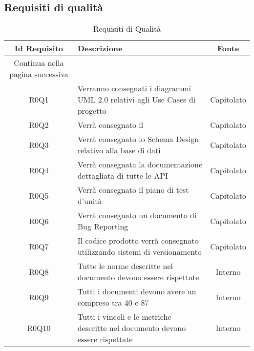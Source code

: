 \begin{center}
\begin{longtable}{cm{8cm}c }
\end{longtable}

\end{center}

\subsection{Requisiti di qualità}

\begin{center}
	\renewcommand{\arraystretch}{2.2}
	
	\begin{longtable}{ c m{8cm} c }
		
		\rowcolor[HTML]{232f3e}
	
		\rowcolors{3}{tableRow}{}
		\color[HTML]{FFFFFF} \textbf{Id Requisito} & \color[HTML]{FFFFFF} \centering\textbf{Descrizione} & \color[HTML]{FFFFFF} \textbf{Fonte} \\
	\endhead
\rowcolor{white}\multicolumn{3}{c}
   { Continua nella pagina successiva} \\
   \endfoot
   \caption [Requisiti di Qualità]{Requisiti di Qualità}
	\label{tabella:reqP1}
   \endlastfoot
		R0Q1 & Verranno consegnati i diagrammi UML 2.0 relativi agli Use Cases di progetto  &  Capitolato \\
		R0Q2 & Verrà consegnato il \glo{Voice Dialog Flow} &  Capitolato \\
		R0Q3 & Verrà consegnato lo Schema Design relativo alla base di dati &  Capitolato \\
		R0Q4 & Verrà consegnata la documentazione dettagliata di tutte le API & Capitolato \\
		R0Q5 & Verrà consegnato il piano di test d'unità & Capitolato \\
		R0Q6 & Verrà consegnato un documento di Bug Reporting & Capitolato \\
		R0Q7 & Il codice prodotto verrà consegnato utilizzando sistemi di versionamento & Capitolato \\
		R0Q8 & Tutte le norme descritte nel documento \docNameVersionNdP{} devono essere rispettate & Interno \\
		R0Q9 & Tutti i documenti devono avere un \glo{indice di Gulpease} compreso tra 40 e 87 & Interno \\
		R0Q10 & Tutti i vincoli e le metriche descritte nel documento \docNameVersionPdQ{} devono essere rispettate & Interno \\
		
	\end{longtable}
	
\end{center}


